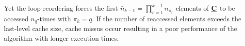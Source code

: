 Yet the loop-reordering forces the first $\bar{n}_{k-1} = \prod_{r=1}^{k-1} n_{\pi_r}$ elements of $\underline{\mathbf{C}}$ to be accessed $n_q$-times with $\pi_k = q$.
If the number of reaccessed elements exceeds the last-level cache size, cache missus occur resulting in a poor performance of the algorithm with longer execution times.
\begin{comment}
\begin{algorithm}[t]
	\DontPrintSemicolon
	\SetKwProg{Fn}{}{}{end}
	\SetKwFunction{TTV}{tensor\_times\_vector<coalesced>}%
	\SetAlgoVlined
	\hrule
	\BlankLine
	\Fn{\TTV{$\mubA, \mbb, \mubC, \mbn, \mbi, \mbpi, q, r$}}
	{
		\uIf{$r > 1$ }
		{
			\For{$i_{\pi_r} \leftarrow 1$ \KwTo $ n_{\pi_r}$}
			{
				\TTV{$\mubA, \mbb, \mubC, \mbn, \mbi, \mbpi, q, r-1$}\;
			}		
		}	
		\Else%
		{			
			\For{$i_{\mbpi_1} \leftarrow 1$ \KwTo $n_{\mbpi_1}$}
			{
				$\mubC(i_1,\dots,i_{q-1},i_{q+1},\dots,i_{p})$ \ttt{+=} $\mubA(i_1,\dots,i_q,\dots,i_p) \cdot \mbb(i_q)$\;			
			}
		}
	}
	\BlankLine
	\hrule
	\caption{
		\footnotesize Sequential version of the mode-$q$ tensor-vector multiplication  with contiguous memory access for tensors with any order $p\geq 2$ and any non-hierarchical storage format. The function initially called with $r=p$ recursively loops over the complete multi-index space of $\mubA$ and $\mubC$.
		\label{alg:ttv.sequential.coalesced}
	}
\end{algorithm}
\end{comment}

